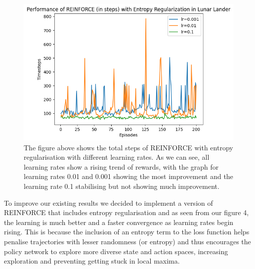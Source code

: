 \documentclass{article}
\begin{document}
\begin{figure}[h!]
\centering
\includegraphics[width=0.85\linewidth]{Report/images/05.Performance_of_REINFORCE_with_ER_Steps.png}
\caption{\label{fig:ReinforceEntropy_Rewards_Steps}The figure above shows the total steps of REINFORCE with entropy regularisation with different learning rates. As we can see, all learning rates show a rising trend of rewards, with the graph for learning rates 0.01 and 0.001 showing the most improvement and the learning rate 0.1 stabilising but not showing much improvement. }
\end{figure}
\par To improve our existing results we decided to implement a version of REINFORCE that includes entropy regularisation and as seen from our figure 4, the learning is much better and a faster convergence as learning rates begin rising. This is because the inclusion of an entropy term to the loss function helps penalise trajectories with lesser randomness (or entropy) and thus encourages the policy network to explore more diverse state and action spaces, increasing exploration and preventing getting stuck in local maxima. 
  
\end{document}
